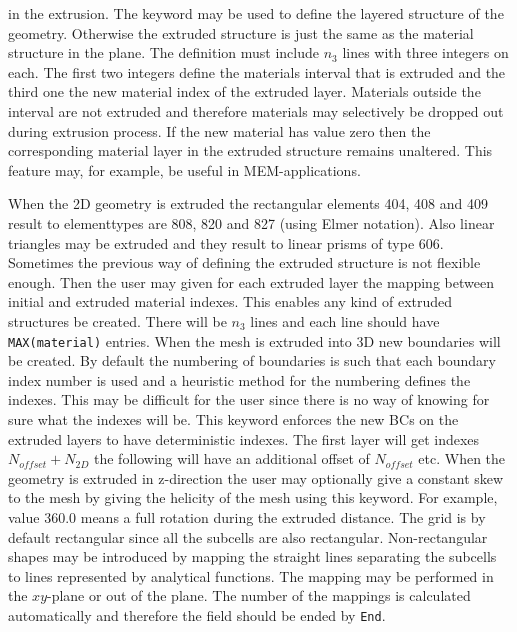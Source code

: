 in the extrusion. 
%
The keyword may be used to define the layered 
structure of the geometry. Otherwise the extruded structure is just the same
as the material structure in the plane. 
The definition must include $n_3$ lines with three integers on each. 
The first two integers define the materials interval that is extruded and
the third one the new material index of the extruded layer.
Materials outside the interval are not extruded and therefore 
materials may selectively be dropped out during extrusion process. 
If the new material has value zero then the corresponding material layer in the 
extruded structure remains unaltered.
This feature may, for example, be useful in MEM-applications. 

When the 2D geometry is extruded the rectangular elements 404, 408 and 409 result to 
elementtypes are 808, 820 and 827 (using Elmer notation). 
Also linear triangles may be extruded and they result to 
linear prisms of type 606.
%
Sometimes the previous way of defining the extruded structure is not flexible enough. Then
the user may given for each extruded layer the mapping between initial and extruded material indexes.
This enables any kind of extruded structures be created. There will be $n_3$ lines and 
each line should have \texttt{MAX(material)} entries. 
%
When the mesh is extruded into 3D new boundaries will be created. By default the numbering of boundaries is such that 
each boundary index number is used and a heuristic method for the numbering defines the indexes. This may be difficult for the 
user since there is no way of knowing for sure what the indexes will be. This keyword enforces the new BCs on the extruded layers 
to have deterministic indexes. The first layer will get indexes $N_{offset}+N_{2D}$ the following will have an additional offset 
of $N_{offset}$ etc.  
%
When the geometry is extruded in z-direction the user may optionally give a constant skew to the mesh by 
giving the helicity of the mesh using this keyword. For example, value 360.0 means a full rotation during 
the extruded distance. 
%
The grid is by default rectangular since all the subcells are also
rectangular. Non-rectangular shapes may be introduced by mapping
the straight lines separating the subcells to lines represented by 
analytical functions. 
The mapping may be performed in the $xy$-plane or out of the plane.
The number of the mappings is calculated automatically and therefore 
the field should be ended by \texttt{End}.

